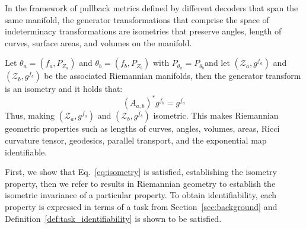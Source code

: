 In the framework of pullback metrics defined by different decoders that span the same manifold, the generator transformations that comprise the space of indeterminacy transformations are isometries that preserve angles, length of curves, surface areas, and volumes on the manifold. %
%
\begin{theorem}\label{thrm:gentransforms_isometries}
    Let $\theta_a=\left(f_a, P_{Z_a}\right)$ and $\theta_b=\left(f_b, P_{Z_b}\right)$ with $P_{\theta_a}=P_{\theta_b}$and let $(\mathcal{Z}_a, g^{f_a})$ and $(\mathcal{Z}_b,g^{f_b})$ be the associated Riemannian manifolds, then the generator transform is an isometry and it holds that:
    \begin{equation}
    \label{eq:isometry}
        \left(A_{a, b}\right)^* g^{f_b}=g^{f_a}
    \end{equation}
    Thus, making $(\mathcal{Z}_a,g^{f_a})$ and $(\mathcal{Z}_b,g^{f_b})$ isometric. This makes Riemannian geometric properties such as lengths of curves, angles, volumes, areas, Ricci curvature tensor, geodesics, parallel transport, and the exponential map identifiable. 
\end{theorem}

\begin{proofsketch}
    First, we show that Eq.~\ref{eq:isometry} is satisfied, establishing the isometry property, then we refer to results in Riemannian geometry to establish the isometric invariance of a particular property. To obtain identifiability, each property is expressed in terms of a task from Section~\ref{sec:background} and Definition~\ref{def:task_identifiability} is shown to be satisfied.
\end{proofsketch}

